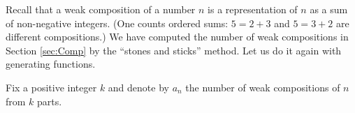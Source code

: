 

\setcounter{section}{3}
\setcounter{subsection}{2}
\setcounter{dfn}{1}

Recall that a weak composition of a number $n$ is a representation of $n$ as a sum of non-negative integers.
(One counts ordered sums: $5 = 2 + 3$ and $5 = 3 + 2$ are different compositions.)
We have computed the number of weak compositions in Section \ref{sec:Comp} by the ``stones and sticks'' method.
Let us do it again with generating functions.

Fix a positive integer $k$ and denote by $a_n$ the number of weak compositions of $n$ from $k$ parts.


